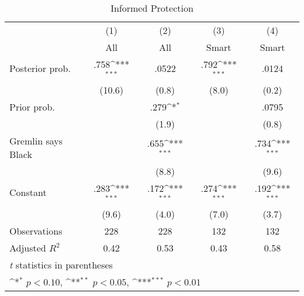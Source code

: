 \begin{table}[htbp]\centering
\def\sym#1{\ifmmode^{#1}\else\(^{#1}\)\fi}
\caption{Informed Protection}
\begin{tabular}{l*{4}{c}}
\hline\hline
                &\multicolumn{1}{c}{(1)}&\multicolumn{1}{c}{(2)}&\multicolumn{1}{c}{(3)}&\multicolumn{1}{c}{(4)}\\
                &\multicolumn{1}{c}{All}&\multicolumn{1}{c}{All}&\multicolumn{1}{c}{Smart}&\multicolumn{1}{c}{Smart}\\
\hline
Posterior prob. &     .758\sym{***}&    .0522         &     .792\sym{***}&    .0124         \\
                &   (10.6)         &    (0.8)         &    (8.0)         &    (0.2)         \\
Prior prob.     &                  &     .279\sym{*}  &                  &    .0795         \\
                &                  &    (1.9)         &                  &    (0.8)         \\
Gremlin says Black&                  &     .655\sym{***}&                  &     .734\sym{***}\\
                &                  &    (8.8)         &                  &    (9.6)         \\
Constant        &     .283\sym{***}&     .172\sym{***}&     .274\sym{***}&     .192\sym{***}\\
                &    (9.6)         &    (4.0)         &    (7.0)         &    (3.7)         \\
\hline
Observations    &      228         &      228         &      132         &      132         \\
Adjusted \(R^{2}\)&     0.42         &     0.53         &     0.43         &     0.58         \\
\hline\hline
\multicolumn{5}{l}{\footnotesize \textit{t} statistics in parentheses}\\
\multicolumn{5}{l}{\footnotesize \sym{*} \(p<0.10\), \sym{**} \(p<0.05\), \sym{***} \(p<0.01\)}\\
\end{tabular}
\end{table}
